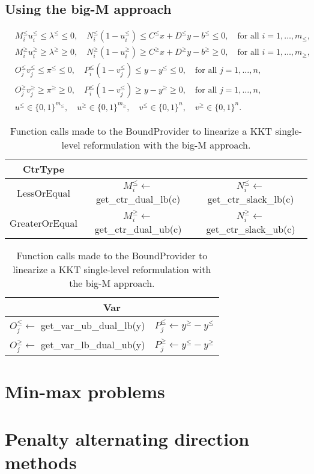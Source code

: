 \subsection{Using the big-M approach}

\begin{align*}
    & M_i^\le u^\le_i \le \lambda^\le \le 0, 
    \quad N_i^\le(1 - u_i^\le) \le C^\le x + D^\le y - b^\le \le 0,  \quad \text{for all } i=1,\dotsc,m_\le,\\
    & M_i^\ge u^\ge_i \ge \lambda^\ge \ge 0, 
    \quad N_i^\ge(1 - u_i^\ge) \ge C^\ge x + D^\ge y - b^\ge \ge 0,  \quad \text{for all } i=1,\dotsc,m_\ge,\\
    & O_j^\le v_j^\le \le \pi^\le \le 0, 
    \quad P_i^\le(1 - v_j^\le) \le y - y^\le \le 0, \quad \text{for all }j=1,\dotsc,n, \\
    & O_j^\ge v_j^\ge \ge \pi^\ge \ge 0, 
    \quad P_i^\le(1 - v_j^\le) \ge y - y^\ge \ge 0, \quad \text{for all }j=1,\dotsc,n, \\
    & u^\le\in\{0,1\}^{m_\le}, \quad u^\ge\in\{0,1\}^{m_\ge}, \quad 
    v^\le\in\{0,1\}^{n}, \quad v^\ge\in\{0,1\}^{n}.
\end{align*}

\begin{table}
    \centering 

    \begin{tabular}{ccc}
        \toprule
        \textsf{CtrType} \\\midrule
        \textsf{LessOrEqual} 
        & $M_i^\le \gets $ \textsf{get\_ctr\_dual\_lb(c)}
        & $N_i^\le \gets $ \textsf{get\_ctr\_slack\_lb(c)} \\
        \textsf{GreaterOrEqual} 
        & $M_i^\ge \gets $ \textsf{get\_ctr\_dual\_ub(c)}
        & $N_i^\ge \gets $ \textsf{get\_ctr\_slack\_ub(c)} \\\bottomrule
    \end{tabular}

    \vspace{.5cm}
    
    \begin{tabular}{ll}
        \toprule
        \multicolumn{2}{c}{\textsf{Var}} \\\midrule
        $O_j^\le\gets$ \textsf{get\_var\_ub\_dual\_lb(y)}
        & $P_j^\le\gets y^\ge - y^\le$ \\
        $O_j^\ge\gets$ \textsf{get\_var\_lb\_dual\_ub(y)}
        & $P_j^\ge\gets  y^\le - y^\ge$ \\\bottomrule
    \end{tabular}

    \caption{Function calls made to the \textsf{BoundProvider} to linearize a KKT single-level reformulation with the big-M approach.}
\end{table}


\section{Min-max problems}

\section{Penalty alternating direction methods}

